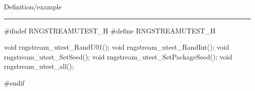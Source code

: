 
Definition/example

\bigskip
\hrule
\code
#ifndef RNGSTREAMUTEST_H
#define RNGSTREAMUTEST_H
\endcode

\code

void rngstream_utest_RandU01();
void rngstream_utest_RandInt();
void rngstream_utest_SetSeed();
void rngstream_utest_SetPackageSeed();
void rngstream_utest_all();

#endif
\endcode
